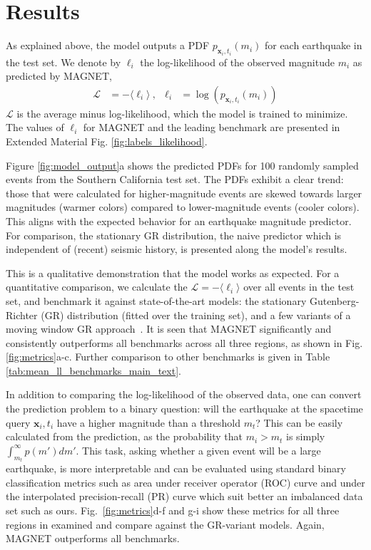 \documentclass[pdflatex]{sn-jnl}
\begin{document}
\section{Results} \label{sec:results}
As explained above, the model outputs a PDF $p_{\textbf{x}_i, t_i}(m_i)$ for each earthquake in the test set. We denote by $\ell_i$ the log-likelihood of the observed magnitude $m_i$ as predicted by MAGNET, 
\begin{align}
    \mathcal{L} &= -\langle \ell_i \rangle\ , 
    &
    \ell_i&=\log\left(p_{\textbf{x}_i, t_i}(m_i)\right)
    \label{eq:likelihood}
\end{align}
 $\mathcal{L}$ is the average minus log-likelihood, which the model is trained to minimize.  The values of $\ell_i$ for MAGNET and the leading benchmark are presented in Extended Material Fig. \ref{fig:labels_likelihood}.
 

Figure \ref{fig:model_output}a shows the predicted PDFs for 100 randomly sampled events from the Southern California test set. The PDFs exhibit a clear trend: those that were calculated for higher-magnitude events are skewed towards larger magnitudes (warmer colors) compared to lower-magnitude events (cooler colors). This aligns with the expected behavior for an earthquake magnitude predictor. For comparison, the stationary GR distribution, the naive predictor which is independent of (recent) seismic history, is presented along the model's results.

This is a qualitative demonstration that the model works as expected. For a quantitative comparison, we calculate the $\mathcal{L}=-\langle \ell_i \rangle$ over all events in the test set, and benchmark it against state-of-the-art models:
the stationary Gutenberg-Richter (GR) distribution (fitted over the training set), and a few variants of a moving window GR approach~\cite{gulia_real-time_2019}. It is seen that MAGNET significantly and consistently outperforms all benchmarks across all three regions, as shown in Fig. \ref{fig:metrics}a-c. Further comparison to other benchmarks is given in Table \ref{tab:mean_ll_benchmarks_main_text}.

In addition to comparing the log-likelihood of the observed data, one can convert the prediction problem to a binary question: will the earthquake at the spacetime query $\textbf{x}_i, t_i$ have a higher magnitude than a threshold $m_t$? This can be easily calculated from the prediction, as the probability that $m_i>m_t$ is simply $\int_{m_t}^{\infty}p(m')dm'$.
This task, asking whether a given event will be a large earthquake, is more interpretable and can be evaluated using standard binary classification metrics such as area under receiver operator (ROC) curve \cite{Murphy} and under the interpolated precision-recall (PR) curve \cite{buttcher_information_2010} which suit better an imbalanced data set such as ours. Fig.~\ref{fig:metrics}d-f and g-i show these metrics for all three regions in examined and compare against the GR-variant models. Again, MAGNET outperforms all benchmarks.
\end{document}
